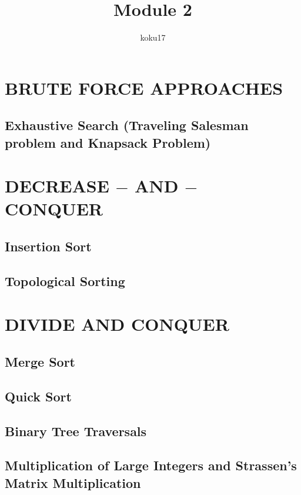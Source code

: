 \documentclass{article}
\author{koku17}
\title{Module 2}
\begin{document}
	\maketitle \thispagestyle{empty} \newpage
	\tableofcontents \thispagestyle{empty} \newpage \setcounter{page}{1}
	\section{BRUTE FORCE APPROACHES}
	\subsection{Exhaustive Search (Traveling Salesman problem and Knapsack Problem)}

	\section{DECREASE $-$ AND $-$ CONQUER}
	\subsection{Insertion Sort}
	\subsection{Topological Sorting}

	\section{DIVIDE AND CONQUER}
	\subsection{Merge Sort}
	\subsection{Quick Sort}
	\subsection{Binary Tree Traversals}
	\subsection{Multiplication of Large Integers and Strassen's Matrix Multiplication}
\end{document}
